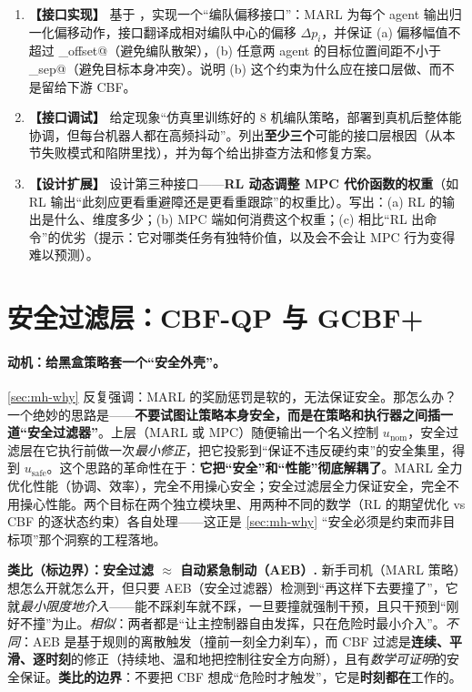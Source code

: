 \begin{practice}
\begin{enumerate}
  \item \textbf{【接口实现】} 基于 \verb@RLToMPCInterface@，实现一个“编队偏移接口”：MARL 为每个 agent 输出归一化偏移动作，接口翻译成相对编队中心的偏移 $\Delta p_i$，并保证 (a) 偏移幅值不超过 \verb@max_offset@（避免编队散架），(b) 任意两 agent 的目标位置间距不小于 \verb@min_sep@（避免目标本身冲突）。说明 (b) 这个约束为什么应在接口层做、而不是留给下游 CBF。
  \item \textbf{【接口调试】} 给定现象“仿真里训练好的 $8$ 机编队策略，部署到真机后整体能协调，但每台机器人都在高频抖动”。列出\textbf{至少三个}可能的接口层根因（从本节失败模式和陷阱里找），并为每个给出排查方法和修复方案。
  \item \textbf{【设计扩展】} 设计第三种接口——\textbf{RL 动态调整 MPC 代价函数的权重}（如 RL 输出“此刻应更看重避障还是更看重跟踪”的权重比）。写出：(a) RL 的输出是什么、维度多少；(b) MPC 端如何消费这个权重；(c) 相比“RL 出命令”的优劣（提示：它对哪类任务有独特价值，以及会不会让 MPC 行为变得难以预测）。
\end{enumerate}
\end{practice}

\section{安全过滤层：CBF-QP 与 GCBF+}
\label{sec:mh-safety}

\paragraph{动机：给黑盒策略套一个“安全外壳”。}
\cref{sec:mh-why} 反复强调：MARL 的奖励惩罚是软的，无法保证安全。那怎么办？一个绝妙的思路是——\textbf{不要试图让策略本身安全，而是在策略和执行器之间插一道“安全过滤器”}。上层（MARL 或 MPC）随便输出一个名义控制 $u_{\text{nom}}$，安全过滤层在它执行前做一次\emph{最小修正}，把它投影到“保证不违反硬约束”的安全集里，得到 $u_{\text{safe}}$。这个思路的革命性在于：\textbf{它把“安全”和“性能”彻底解耦了}。MARL 全力优化性能（协调、效率），完全不用操心安全；安全过滤层全力保证安全，完全不用操心性能。两个目标在两个独立模块里、用两种不同的数学（RL 的期望优化 vs CBF 的逐状态约束）各自处理——这正是 \cref{sec:mh-why} “安全必须是约束而非目标项”那个洞察的工程落地。

\begin{note}
\textbf{类比（标边界）：安全过滤 $\approx$ 自动紧急制动（AEB）.}\;
新手司机（MARL 策略）想怎么开就怎么开，但只要 AEB（安全过滤器）检测到“再这样下去要撞了”，它就\emph{最小限度地介入}——能不踩刹车就不踩，一旦要撞就强制干预，且只干预到“刚好不撞”为止。\emph{相似}：两者都是“让主控制器自由发挥，只在危险时最小介入”。\emph{不同}：AEB 是基于规则的离散触发（撞前一刻全力刹车），而 CBF 过滤是\textbf{连续、平滑、逐时刻}的修正（持续地、温和地把控制往安全方向掰），且有\emph{数学可证明}的安全保证。\textbf{类比的边界}：不要把 CBF 想成“危险时才触发”，它是\textbf{时刻都在}工作的。
\end{note}

